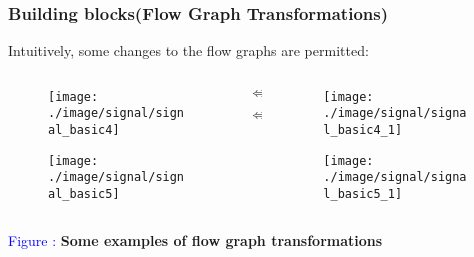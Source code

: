 \documentclass{beamer}
\newcommand{\blue}[1]{\textcolor{blue}{#1}}
\begin{document}

\begin{frame}


\frametitle{Building blocks(Flow Graph Transformations)}
Intuitively, some changes to the flow graphs are permitted:
\begin{columns}
\begin{column}{5 cm}
  \begin{figure}[H]
  \centering
  \texttt{[image: ./image/signal/signal\_basic4]}
  \end{figure}
  \begin{figure}[H]
  \centering
  \texttt{[image: ./image/signal/signal\_basic5]}
  \end{figure}
\end{column}
\begin{column}{2 cm}
\centerline{\huge $\Leftrightarrow$}\newline
\vspace{1.5 cm}
\centerline{\huge $\Leftrightarrow$}
\end{column}
\begin{column}{5 cm}
  \vspace{0.8 cm}
  \begin{figure}[H]
  \centering
  \texttt{[image: ./image/signal/signal\_basic4\_1]}
  \end{figure}
  \begin{figure}[H]
  \centering
  \texttt{[image: ./image/signal/signal\_basic5\_1]}
  \end{figure}
\end{column}
\end{columns}
\centerline{\blue{Figure :} {\bf Some examples of flow graph transformations}}


\end{frame}


\end{document}

